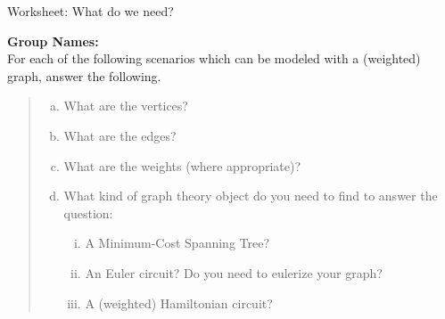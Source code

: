 \documentclass[12pt]{article}
\newcommand{\be}{\begin{enumerate}}
\newcommand{\ee}{\end{enumerate}}
\begin{document}
\begin{center}
{\Large  Worksheet:  What do we need?	}
\end{center}



\noindent \textbf{Group Names:} \hrulefill \\

For each of the following scenarios which can be modeled with a (weighted) graph, answer the following.
\begin{quote}
\be[(a)]
\item What are the vertices?
\item What are the edges?
\item What are the weights (where appropriate)?
\item What kind of graph theory object do you need to find to answer the question:
\be[i.]
\item A Minimum-Cost Spanning Tree?
\item An Euler circuit? Do you need to eulerize your graph?
\item A (weighted) Hamiltonian circuit?
\ee
\ee
\end{quote}
\end{document}
